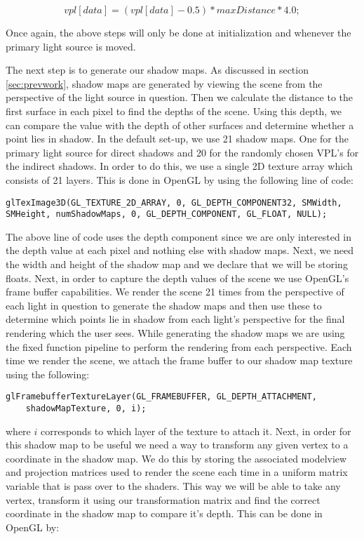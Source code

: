 \begin{equation}
vpl[data] = (vpl[data]-0.5)*maxDistance*4.0; \label{eqn:vplDecode}
\end{equation}

Once again, the above steps will only be done at initialization and whenever the primary light source is moved.

The next step is to generate our shadow maps.  As discussed in section \ref{sec:prevwork}, shadow maps are generated by viewing the scene from the perspective of the light source in question.  Then we calculate the distance to the first surface in each pixel to find the depths of the scene.  Using this depth, we can compare the value with the depth of other surfaces and determine whether a point lies in shadow.  In the default set-up, we use 21 shadow maps. One for the primary light source for direct shadows and 20 for the randomly chosen VPL's for the indirect shadows.  In order to do this, we use a single 2D texture array which consists of 21 layers.  This is done in OpenGL by using the following line of code:


\begin{lstlisting}
glTexImage3D(GL_TEXTURE_2D_ARRAY, 0, GL_DEPTH_COMPONENT32, SMWidth, 
SMHeight, numShadowMaps, 0, GL_DEPTH_COMPONENT, GL_FLOAT, NULL);
\end{lstlisting}

The above line of code uses the depth component since we are only interested in the depth value at each pixel and nothing else with shadow maps.  Next, we need the width and height of the shadow map and we declare that we will be storing floats.  Next, in order to capture the depth values of the scene we use OpenGL's frame buffer capabilities.  We render the scene 21 times from the perspective of each light in question to generate the shadow maps and then use these to determine which points lie in shadow from each light's perspective for the final rendering which the user sees.  While generating the shadow maps we are using the fixed function pipeline to perform the rendering from each perspective.  Each time we render the scene, we attach the frame buffer to our shadow map texture using the following:


\begin{lstlisting}
glFramebufferTextureLayer(GL_FRAMEBUFFER, GL_DEPTH_ATTACHMENT, 
	shadowMapTexture, 0, i);
\end{lstlisting}

where $i$ corresponds to which layer of the texture to attach it.  Next, in order for this shadow map to be useful we need a way to transform any given vertex to a coordinate in the shadow map.  We do this by storing the associated modelview and projection matrices used to render the scene each time in a uniform matrix variable that is pass over to the shaders.  This way we will be able to take any vertex, transform it using our transformation matrix and find the correct coordinate in the shadow map to compare it's depth.  This can be done in OpenGL by:


